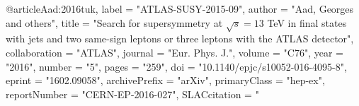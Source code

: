 

@article{Aad:2016tuk,
      label          = "ATLAS-SUSY-2015-09",
      author         = "Aad, Georges and others",
      title          = "{Search for supersymmetry at $\sqrt{s}=13$  TeV in final
                        states with jets and two same-sign leptons or three
                        leptons with the ATLAS detector}",
      collaboration  = "ATLAS",
      journal        = "Eur. Phys. J.",
      volume         = "C76",
      year           = "2016",
      number         = "5",
      pages          = "259",
      doi            = "10.1140/epjc/s10052-016-4095-8",
      eprint         = "1602.09058",
      archivePrefix  = "arXiv",
      primaryClass   = "hep-ex",
      reportNumber   = "CERN-EP-2016-027",
      SLACcitation   = "%
}

